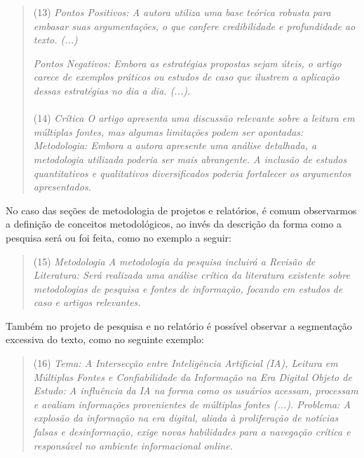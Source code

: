 \documentclass[portuguese]{textolivre}
\begin{document}
\begin{quote}
(13) \textit{Pontos Positivos: \newline
A autora utiliza uma base teórica robusta para embasar suas argumentações, o que confere credibilidade e profundidade ao texto. (...)}

\smallskip

\textit{Pontos Negativos:\newline
Embora as estratégias propostas sejam úteis, o artigo carece de exemplos práticos ou estudos de caso que ilustrem a aplicação dessas estratégias no dia a dia. (...).}
\\
\\
(14) \textit{Crítica\newline
O artigo apresenta uma discussão relevante sobre a leitura em múltiplas fontes, mas algumas limitações podem ser apontadas:\newline
Metodologia: Embora a autora apresente uma análise detalhada, a metodologia utilizada poderia ser mais abrangente. A inclusão de estudos quantitativos e qualitativos diversificados poderia fortalecer os argumentos apresentados.}
\end{quote}

No caso das seções de metodologia de projetos e relatórios, é comum observarmos a definição de conceitos metodológicos, ao invés da descrição da forma como a pesquisa será ou foi feita, como no exemplo a seguir:

\begin{quote}
(15) \textit{Metodologia\newline
A metodologia da pesquisa incluirá a Revisão de Literatura: Será realizada uma análise crítica da literatura existente sobre metodologias de pesquisa e fontes de informação, focando em estudos de caso e artigos relevantes.}
\end{quote}

Também no projeto de pesquisa e no relatório é possível observar a segmentação excessiva do texto, como no seguinte exemplo:

\begin{quote}
(16) \textit{Tema: A Intersecção entre Inteligência Artificial (IA), Leitura em Múltiplas Fontes e Confiabilidade da Informação na Era Digital\newline
Objeto de Estudo: A influência da IA na forma como os usuários acessam, processam e avaliam informações provenientes de múltiplas fontes (...). \newline
Problema: A explosão da informação na era digital, aliada à proliferação de notícias falsas e desinformação, exige novas habilidades para a navegação crítica e responsável no ambiente informacional online.}
\end{quote}
\end{document}
